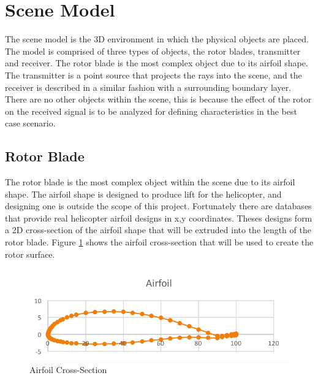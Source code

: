 \section{Scene Model}
The scene model is the 3D environment in which the physical objects are placed. 
The model is comprised of three types of objects, the rotor blades, transmitter and receiver. The rotor blade is the most complex object due to its airfoil shape. The transmitter is a point source that projects the rays into the scene, and the receiver is described in a similar fashion with a surrounding boundary layer. There are no other objects within the scene, this is because the effect of the rotor on the received signal is to be analyzed for defining characteristics in the best case scenario.

\subsection{Rotor Blade}
The rotor blade is the most complex object within the scene due to its airfoil shape. The airfoil shape is designed to produce lift for the helicopter, and designing one is outside the scope of this project. Fortunately there are databases that provide real helicopter airfoil designs in x,y coordinates. Theses designs form a 2D cross-section of the airfoil shape that will be extruded into the length of the rotor blade. Figure \ref{fig:airfoil} shows the airfoil cross-section that will be used to create the rotor surface. 

\begin{figure}
	\begin{center}
		\includegraphics[width=15cm]{images/radio_propagation/2d_airfoil.png}
		\caption{Airfoil Cross-Section}
		\label{fig:airfoil}
	\end{center}
\end{figure}

